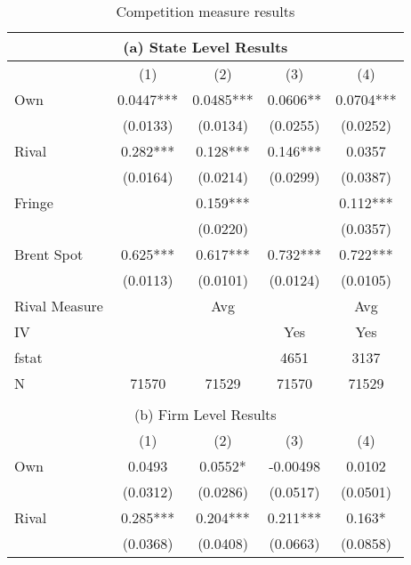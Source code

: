 \documentclass[12pt]{article}
\begin{document}
\begin{longtable}{l*{4}{c}}
    \caption{Competition measure results}  \label{tab:RivalComp} \\
    \multicolumn{5}{c}{(a) State Level Results} \\
\hline 
                &\multicolumn{1}{c}{(1)}   &\multicolumn{1}{c}{(2)}   &\multicolumn{1}{c}{(3)}   &\multicolumn{1}{c}{(4)}   \\
\hline
Own             &   0.0447***&   0.0485***&   0.0606** &   0.0704***\\
                & (0.0133)   & (0.0134)   & (0.0255)   & (0.0252)   \\
\addlinespace
Rival           &    0.282***&    0.128***&    0.146***&   0.0357   \\
                & (0.0164)   & (0.0214)   & (0.0299)   & (0.0387)   \\
\addlinespace
Fringe          &            &    0.159***&            &    0.112***\\
                &            & (0.0220)   &            & (0.0357)   \\
\addlinespace
Brent Spot      &    0.625***&    0.617***&    0.732***&    0.722***\\
                & (0.0113)   & (0.0101)   & (0.0124)   & (0.0105)   \\
\hline
Rival Measure   &            &      Avg   &            &      Avg   \\
IV              &            &            &      Yes   &      Yes   \\
fstat           &            &            &     4651   &     3137   \\
N               &    71570   &    71529   &    71570   &    71529   \\
\hline \\
    \multicolumn{5}{c}{(b) Firm Level Results} \\
    \hline
                &\multicolumn{1}{c}{(1)}   &\multicolumn{1}{c}{(2)}   &\multicolumn{1}{c}{(3)}   &\multicolumn{1}{c}{(4)}   \\
\hline
Own             &   0.0493   &   0.0552*  & -0.00498   &   0.0102   \\
                & (0.0312)   & (0.0286)   & (0.0517)   & (0.0501)   \\
\addlinespace
Rival           &    0.285***&    0.204***&    0.211***&    0.163*  \\
                & (0.0368)   & (0.0408)   & (0.0663)   & (0.0858)   \\

\end{longtable}
\end{document}
